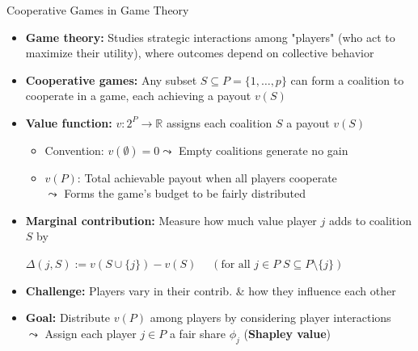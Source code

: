 \documentclass[10pt,compress,t,notes=noshow, xcolor=table]{beamer}
\begin{document}
\begin{frame}{Cooperative Games in Game Theory }
\begin{itemize}%
  \item \textbf{Game theory:} Studies strategic interactions among "players" (who act to maximize their utility), where outcomes depend on collective behavior
  \item \textbf{Cooperative games:} Any subset $S \subseteq P = \{1, \ldots, p\}$ can form a coalition to cooperate in a game, each achieving a payout $v(S)$
  \pause
  \item \textbf{Value function:} $v: 2^P \rightarrow \mathbb{R}$ assigns each coalition $S$ a payout $v(S)$ 
  \begin{itemize}
      \item Convention: $v(\emptyset) = 0 \leadsto$  Empty coalitions generate no gain
      \item $v(P)$: Total achievable payout when all players cooperate\\
      $\leadsto$ Forms the game's budget to be fairly distributed
  \end{itemize}%
    \item \textbf{Marginal contribution:} Measure how much value player \(j\) adds to coalition \( S \) by

    \medskip
    
    \centerline{$\Delta (j, S) := v(S \cup \{j\}) - v(S) \quad \; \left(\text{for all } j \in P \; S \subseteq P \setminus \{j\}\right)$}

    \medskip
    \pause
  \item \textbf{Challenge:} Players vary in their contrib. \& how they influence each other
  \item \textbf{Goal:} Distribute $v(P)$ among players by considering player interactions\\
  $\leadsto$ Assign each player $j \in P$ a fair share $\phi_j$ (\textbf{Shapley value}) 
\end{itemize}
\end{frame}
\end{document}
